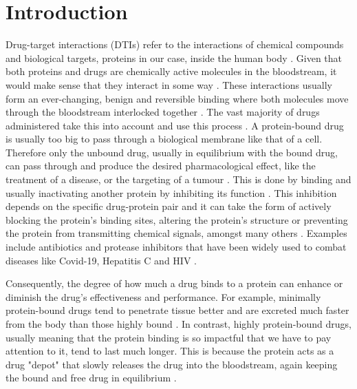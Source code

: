 \section{Introduction}
\label{sec:Introduction}

Drug-target interactions (DTIs) refer to the interactions of chemical compounds and biological targets, proteins in our case, inside the human body \citep{Sachdev2019}. Given that both proteins and drugs are chemically active molecules in the bloodstream, it would make sense that they interact in some way \citep{DerangedPhysiology}. These interactions usually form an ever-changing, benign and reversible binding where both molecules move through the bloodstream interlocked together \citep{DerangedPhysiology}. The vast majority of drugs administered take this into account and use this process \citep{DerangedPhysiology}. A protein-bound drug is usually too big to pass through a biological membrane like that of a cell. Therefore only the unbound drug, usually in equilibrium with the bound drug, can pass through and produce the desired pharmacological effect, like the treatment of a disease, or the targeting of a tumour \citep{ProteinBindingOverview}. This is done by binding and usually inactivating another protein by inhibiting its function \citep{Lu2020}. This inhibition depends on the specific drug-protein pair and it can take the form of actively blocking the protein's binding sites, altering the protein's structure or preventing the protein from transmitting chemical signals, amongst many others \citep{Mozhaev1982}. Examples include antibiotics and protease inhibitors that have been widely used to combat diseases like Covid-19, Hepatitis C and HIV \citep{Berry2022, Ma2022}.

\hspace{1cm}

Consequently, the degree of how much a drug binds to a protein can enhance or diminish the drug's effectiveness and performance. For example, minimally protein-bound drugs tend to penetrate tissue better and are excreted much faster from the body than those highly bound \citep{Scheife1989}. In contrast, highly protein-bound drugs, usually meaning that the protein binding is so impactful that we have to pay attention to it, tend to last much longer. This is because the protein acts as a drug "depot" that slowly releases the drug into the bloodstream, again keeping the bound and free drug in equilibrium \citep{DerangedPhysiology, ProteinBindingOverview}.

